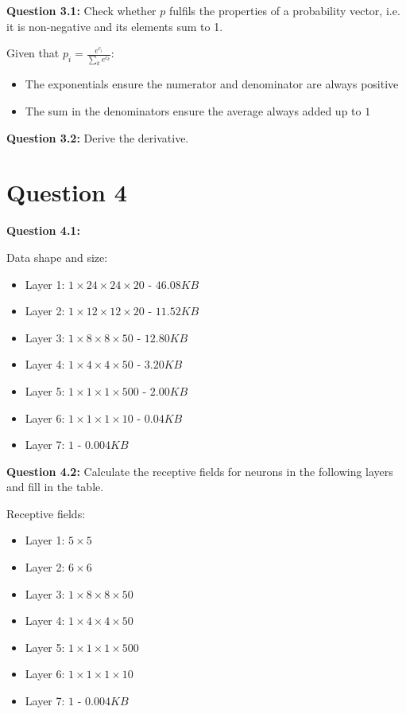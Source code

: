 \documentclass[12pt]{article}
\begin{document}
\textbf{Question 3.1:} Check whether $p$ fulfils the properties of a probability
vector, i.e. it is non-negative and its elements sum to 1.

Given that $p_i = \frac{e^{c_i}}{\sum_k e^{c_k}}$:
\begin{itemize}
    \item The exponentials ensure the numerator and denominator are always
    positive 
    \item The sum in the denominators ensure the average always added up to $1$ 
\end{itemize}

\textbf{Question 3.2:} Derive the derivative. 



\section*{Question 4}

\textbf{Question 4.1:}

Data shape and size:
\begin{itemize}
    \item Layer 1: $1 \times 24 \times 24 \times 20$ - $46.08 KB$
    \item Layer 2: $1 \times 12 \times 12 \times 20$ - $11.52 KB$
    \item Layer 3: $1 \times 8 \times 8 \times 50$ - $12.80 KB$
    \item Layer 4: $1 \times 4 \times 4 \times 50$ - $3.20 KB$
    \item Layer 5: $1 \times 1 \times 1 \times 500$ - $2.00 KB$
    \item Layer 6: $1 \times 1 \times 1 \times 10$ - $0.04 KB$
    \item Layer 7: $1$ - $0.004 KB$
\end{itemize}

\textbf{Question 4.2:} Calculate the receptive fields for neurons in the
following layers and fill in the table.

Receptive fields:
\begin{itemize}
    \item Layer 1: $5 \times 5$ 
    \item Layer 2: $6 \times 6$ 
    \item Layer 3: $1 \times 8 \times 8 \times 50$ 
    \item Layer 4: $1 \times 4 \times 4 \times 50$ 
    \item Layer 5: $1 \times 1 \times 1 \times 500$ 
    \item Layer 6: $1 \times 1 \times 1 \times 10$ 
    \item Layer 7: $1$ - $0.004 KB$
\end{itemize}
\end{document}
